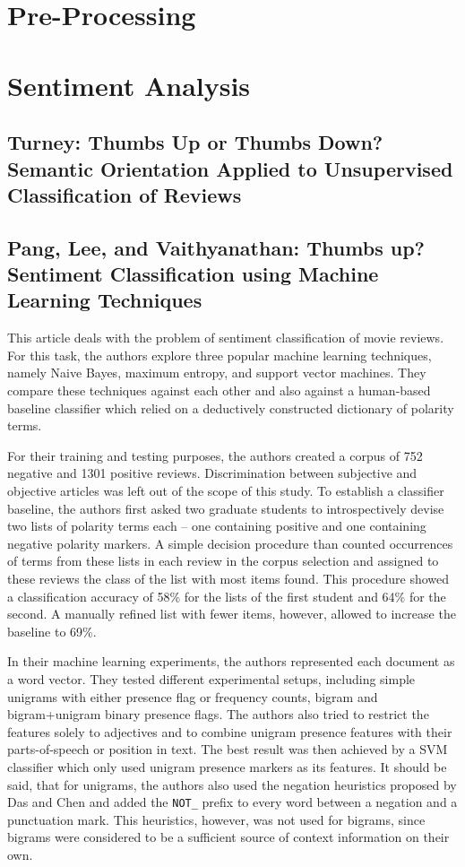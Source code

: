 \documentclass[a4paper,11pt]{article}
\begin{document}
\section{Pre-Processing}

\section{Sentiment Analysis}
\subsection{Turney: Thumbs Up or Thumbs Down? Semantic Orientation Applied to
               Unsupervised Classification of Reviews\cite{Turney-02}}

\subsection{Pang, Lee, and Vaithyanathan: Thumbs up? Sentiment Classification using Machine
                  Learning Techniques\cite{Pang-Lee-02}}

This article deals with the problem of sentiment classification of movie
reviews.  For this task, the authors explore three popular machine learning
techniques, namely Naive Bayes, maximum entropy, and support vector machines.
They compare these techniques against each other and also against a
human-based baseline classifier which relied on a deductively constructed
dictionary of polarity terms.

For their training and testing purposes, the authors created a corpus of 752
negative and 1301 positive reviews.  Discrimination between subjective and
objective articles was left out of the scope of this study.  To establish a
classifier baseline, the authors first asked two graduate students to
introspectively devise two lists of polarity terms each -- one containing
positive and one containing negative polarity markers.  A simple decision
procedure than counted occurrences of terms from these lists in each review in
the corpus selection and assigned to these reviews the class of the list with
most items found.  This procedure showed a classification accuracy of 58\% for
the lists of the first student and 64\% for the second.  A manually refined
list with fewer items, however, allowed to increase the baseline to 69\%.

In their machine learning experiments, the authors represented each document
as a word vector.  They tested different experimental setups, including simple
unigrams with either presence flag or frequency counts, bigram and
bigram+unigram binary presence flags.  The authors also tried to restrict the
features solely to adjectives and to combine unigram presence features with
their parts-of-speech or position in text.  The best result was then achieved
by a SVM classifier which only used unigram presence markers as its features.
It should be said, that for unigrams, the authors also used the negation
heuristics proposed by Das and Chen \cite{Das-Chen-01} and added the
\texttt{NOT\_} prefix to every word between a negation and a punctuation mark.
This heuristics, however, was not used for bigrams, since bigrams were
considered to be a sufficient source of context information on their own.
\end{document}

